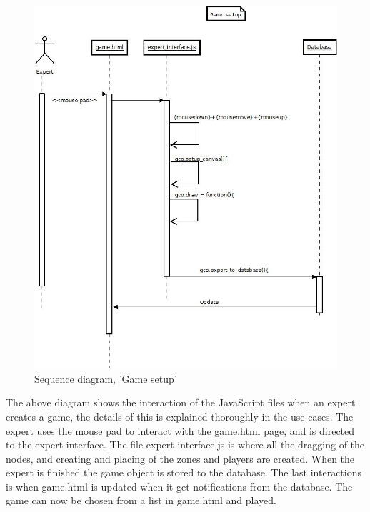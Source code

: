 \begin{figure}[H]
  \centering
    \includegraphics[width=1.0\textwidth]{img/gamesetupsekvens.jpeg}
  \caption{Sequence diagram, 'Game setup'} 
  \label{fig:gamesetupseq}
\end{figure}

The above diagram shows the interaction of the JavaScript files when an expert creates a game, the details of this is explained thoroughly in the use cases. The expert uses the mouse pad to interact with the game.html page, and is directed to the expert interface. The file expert interface.js is where all the dragging of the nodes, and creating and placing of the zones and players are created. When the expert is finished the game object is stored to the database. The last interactions is when game.html is updated when it get notifications from the database. The game can now be chosen from a list in game.html and played. 

